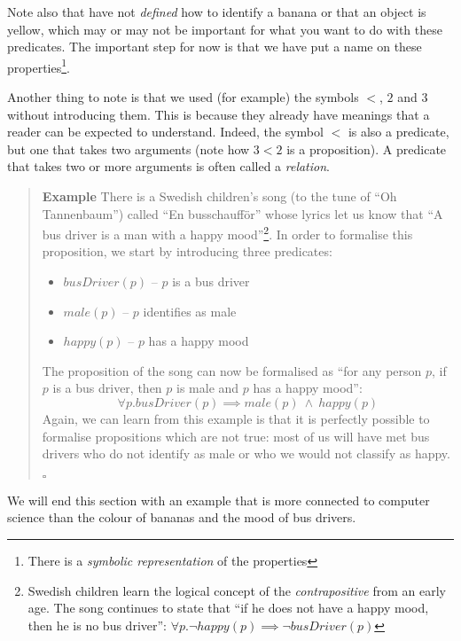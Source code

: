 \documentclass{tufte-handout}
\newcounter{example}
\newenvironment{example}
{\refstepcounter{example}\begin{quote}
\textbf{Example \arabic{example}}}
{

$\square$\end{quote}}
\begin{document}
\noindent
Note also that have not \emph{defined} how to identify a banana or
that an object is yellow, which may or may not be important for
what you want to do with these predicates. The important step for
now is that we have put a name on these properties\footnote{There
  is a \emph{symbolic representation} of the properties}.

Another thing to note is that we used (for example) the symbols
$<$, $2$ and $3$ without introducing them. This is because they
already have meanings that a reader can be expected to understand.
Indeed, the symbol $<$ is also a predicate, but one that takes two
arguments (note how $3 < 2$ is a proposition). A predicate that
takes two or more arguments is often called a \emph{relation}.

\begin{example}\label{ex:busdriver}
  There is a Swedish children's song (to the tune of ``Oh
  Tannenbaum'') called ``En busschauff\"{o}r'' whose lyrics let us
  know that ``A bus driver is a man with a happy
  mood''\footnote{Swedish children learn the logical concept of
    the \emph{contrapositive} from an early age. The song
    continues to state that ``if he does not have a happy mood,
    then he is no bus driver'':
    $\forall p. \lnot \mathit{happy}(p) \implies \lnot
    \mathit{busDriver}(p)$}. In order to formalise this
  proposition, we start by introducing three predicates:
  \begin{itemize}
  \item $\mathit{busDriver}(p)$ -- $p$ is a bus driver
  \item $\mathit{male}(p)$ -- $p$ identifies as male
  \item $\mathit{happy}(p)$ -- $p$ has a happy mood
  \end{itemize}
  The proposition of the song can now be formalised as ``for any
  person $p$, if $p$ is a bus driver, then $p$ is male and $p$ has
  a happy mood'':
  \[
    \forall p.
    \mathit{busDriver}(p) \implies
    \mathit{male}(p) ~\land~
    \mathit{happy}(p)
  \]
  Again, we can learn from this example is that it is perfectly
  possible to formalise propositions which are not true: most of
  us will have met bus drivers who do not identify as male or who
  we would not classify as happy.
\end{example}

\noindent
We will end this section with an example that is more connected to
computer science than the colour of bananas and the mood of bus
drivers.
\end{document}
